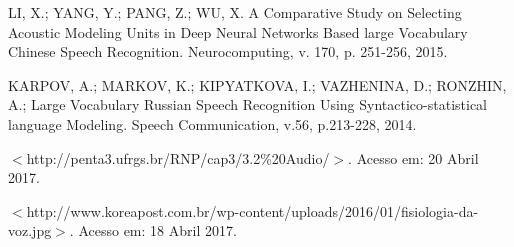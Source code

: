 \documentclass[a4paper,12pt,twoside,openright]{report}
\begin{document}
\begin{thebibliography}{00}
LI, X.; YANG, Y.; PANG, Z.; WU, X. A Comparative Study on Selecting Acoustic Modeling Units in Deep Neural Networks Based large Vocabulary Chinese Speech Recognition. Neurocomputing, v. 170, p. 251-256, 2015.


KARPOV, A.; MARKOV, K.; KIPYATKOVA, I.; VAZHENINA, D.; RONZHIN, A.; Large Vocabulary Russian Speech Recognition Using Syntactico-statistical language Modeling. Speech Communication, v.56, p.213-228, 2014.


$<$http://penta3.ufrgs.br/RNP/cap3/3.2\%20Audio/$>$. Acesso em: 20 Abril 2017.


$<$http://www.koreapost.com.br/wp-content/uploads/2016/01/fisiologia-da-voz.jpg$>$. Acesso em: 18 Abril 2017. 

\end{thebibliography}
\end{document}

